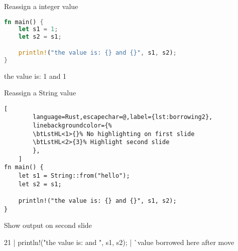 
\begin{frame}[fragile,t]{Reassign a integer value}
    \begin{lstlisting}[language=Rust,escapechar=@,label={lst:borrowing1}]
fn main() {
    let s1 = 1;
    let s2 = s1;

    println!("the value is: {} and {}", s1, s2);
}\end{lstlisting}
    \pause %
    \begin{codeoutput}
the value is: 1 and 1
\end{codeoutput}
\end{frame}

\begin{frame}[fragile,t]{Reassign a String value}
    \begin{lstlisting}[
        language=Rust,escapechar=@,label={lst:borrowing2},
        linebackgroundcolor={%
        \btLstHL<1>{}% No highlighting on first slide
        \btLstHL<2>{3}% Highlight second slide
        },
    ]
fn main() {
    let s1 = String::from("hello");
    let s2 = s1;

    println!("the value is: {} and {}", s1, s2);
}\end{lstlisting}
    \pause Show output on second slide
    \begin{codeoutput}[red]
21 |     println!("the value is: {} and {}", s1, s2);
   |                                         ^^ value
borrowed here after move\end{codeoutput}
\end{frame}
